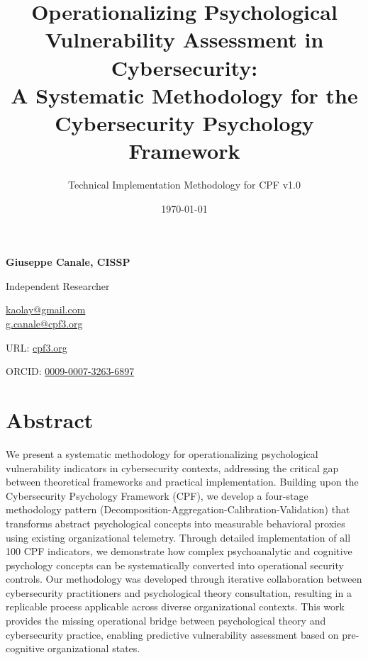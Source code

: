 \documentclass[11pt, onecolumn]{article}
\title{Operationalizing Psychological Vulnerability Assessment in Cybersecurity:\\A Systematic Methodology for the Cybersecurity Psychology Framework}
\author{Technical Implementation Methodology for CPF v1.0}
\date{\today}
\begin{document}
\maketitle

\begin{center}
  \Large
  \textbf{Giuseppe Canale, CISSP}
  
  \vspace{0.2cm}
  \normalsize
  Independent Researcher
  
  \vspace{0.2cm}
  \href{mailto:kaolay@gmail.com}{kaolay@gmail.com} \\
  \href{mailto:g.canale@cpf3.org}{g.canale@cpf3.org}
  
  \vspace{0.2cm}
  URL: \href{https://cpf3.org}{cpf3.org}
  
  \vspace{0.2cm}
  ORCID: \href{https://orcid.org/0009-0007-3263-6897}{0009-0007-3263-6897}
\end{center}

\vspace{0.8cm}

\section*{Abstract}
We present a systematic methodology for operationalizing psychological vulnerability indicators in cybersecurity contexts, addressing the critical gap between theoretical frameworks and practical implementation. Building upon the Cybersecurity Psychology Framework (CPF), we develop a four-stage methodology pattern (Decomposition-Aggregation-Calibration-Validation) that transforms abstract psychological concepts into measurable behavioral proxies using existing organizational telemetry. Through detailed implementation of all 100 CPF indicators, we demonstrate how complex psychoanalytic and cognitive psychology concepts can be systematically converted into operational security controls. Our methodology was developed through iterative collaboration between cybersecurity practitioners and psychological theory consultation, resulting in a replicable process applicable across diverse organizational contexts. This work provides the missing operational bridge between psychological theory and cybersecurity practice, enabling predictive vulnerability assessment based on pre-cognitive organizational states.

\vspace{0.8cm}
\end{document}
